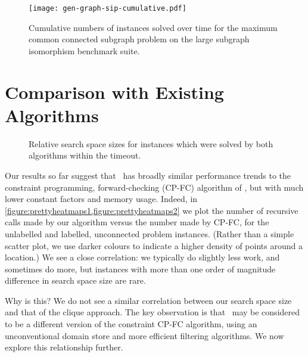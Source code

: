 \documentclass[letterpaper]{article}
\newcommand{\citet}[1]{\citeauthor{#1} \shortcite{#1}}
\newcommand{\McSplit}{\textproc{McSplit}}
\begin{document}
\begin{figure}[t]
    \centering
    \texttt{[image: gen-graph-sip-cumulative.pdf]}
    \caption{Cumulative numbers of instances solved over time for the maximum
    common connected subgraph problem on the large subgraph isomorphism benchmark
    suite.} \label{figure:sip-cumulative}
\end{figure}

\section{Comparison with Existing Algorithms}\label{sec:comparison}

\begin{figure*}[t]
    \centering\subfiguretopcaptrue
    \caption{Relative search space sizes for instances which were solved by both algorithms within the timeout.}
    \label{figure:prettyheatmaps}
\end{figure*}

Our results so far suggest that \McSplit\ has broadly similar performance
trends to the constraint programming, forward-checking (CP-FC) algorithm of
\citet{DBLP:conf/cp/NdiayeS11}, but with much lower constant factors and memory usage. Indeed,
in \cref{figure:prettyheatmaps1,figure:prettyheatmaps2} we plot the number of
recursive calls made by our algorithm versus the number made by
CP-FC, for the unlabelled and labelled, unconnected problem
instances. (Rather than a simple scatter plot, we use darker colours to
indicate a higher density of points around a location.) We see a close
correlation: we typically do slightly less work, and sometimes do more, but
instances with more than one order of magnitude difference in search space size
are rare.

Why is this? We do not see a similar correlation between our search space size
and that of the clique approach. The key observation is that \McSplit\ may be
considered to be a different version of the constraint CP-FC algorithm, using
an unconventional domain store and more efficient filtering algorithms. We now
explore this relationship further.
\end{document}
